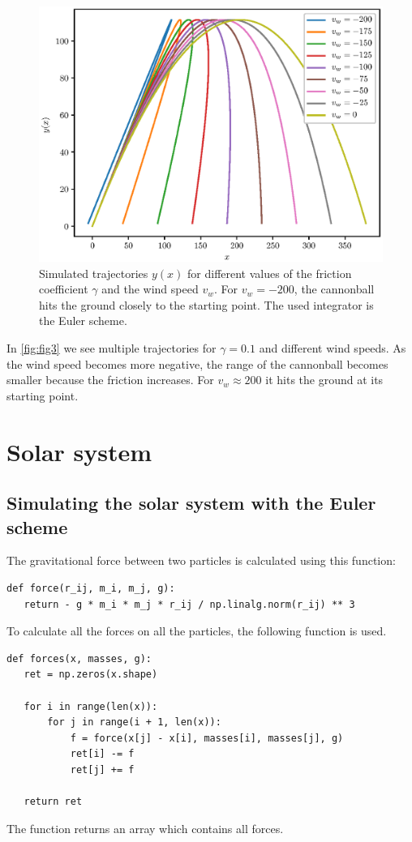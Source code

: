 \documentclass[a4paper,10pt,bibtotoc]{scrartcl}
\begin{document}
\begin{figure}[t]
 \includegraphics{Figure_3.eps}
 \caption{Simulated trajectories $y(x)$ for different values of the friction coefficient $\gamma$ and the wind speed $v_w$. For $v_w= -200$, the cannonball hits the ground closely to the starting point. The used integrator is the Euler scheme.}
 \label{fig:fig3}
\end{figure}

In \autoref{fig:fig3} we see multiple trajectories for $\gamma=0.1$ and different wind speeds. As the wind speed becomes more negative, the range of the cannonball becomes smaller because the friction increases. For $v_w\approx 200$ it hits the ground at its starting point.



\section{Solar system}
\subsection{Simulating the solar system with the Euler scheme}
The gravitational force between two particles is calculated using this function:
\begin{lstlisting}
def force(r_ij, m_i, m_j, g):
   return - g * m_i * m_j * r_ij / np.linalg.norm(r_ij) ** 3
\end{lstlisting}
To calculate all the forces on all the particles, the following function is used.
\begin{lstlisting}
def forces(x, masses, g):
   ret = np.zeros(x.shape)

   for i in range(len(x)):
       for j in range(i + 1, len(x)):
           f = force(x[j] - x[i], masses[i], masses[j], g)
           ret[i] -= f
           ret[j] += f

   return ret
\end{lstlisting}
The function returns an array which contains all forces.
\end{document}
